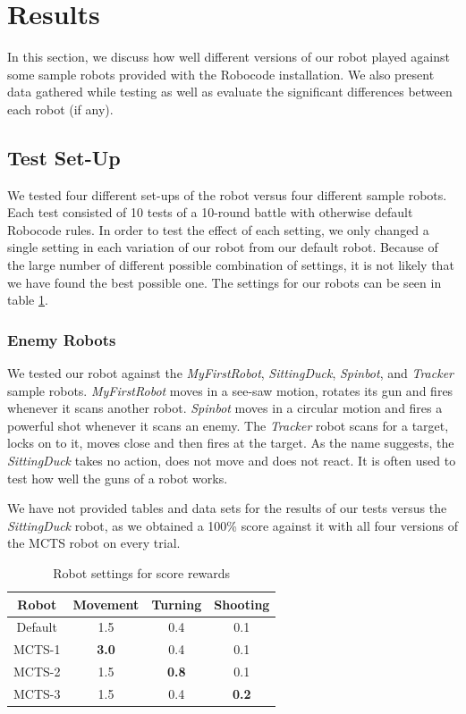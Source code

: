 \section{Results}
\label{05}
In this section, we discuss how well different versions of our robot played against some sample robots provided with the Robocode installation. We also present data gathered while testing as well as evaluate the significant differences between each robot (if any).

\subsection{Test Set-Up}
We tested four different set-ups of the robot versus four different sample robots. Each test consisted of 10 tests of a 10-round battle with otherwise default Robocode rules. In order to test the effect of each setting, we only changed a single setting in each variation of our robot from our default robot. Because of the large number of different possible combination of settings, it is not likely that we have found the best possible one. The settings for our robots can be seen in table \ref{table-robotsettings}.

\subsubsection{Enemy Robots} 
We tested our robot against the \textit{MyFirstRobot}, \textit{SittingDuck}, \textit{Spinbot}, and \textit{Tracker} sample robots. \textit{MyFirstRobot} moves in a see-saw motion, rotates its gun and fires whenever it scans another robot. \textit{Spinbot} moves in a circular motion and fires a powerful shot whenever it scans an enemy. The \textit{Tracker} robot scans for a target, locks on to it, moves close and then fires at the target. As the name suggests, the \textit{SittingDuck} takes no action, does not move and does not react. It is often used to test how well the guns of a robot works.

We have not provided tables and data sets for the results of our tests versus the \textit{SittingDuck} robot, as we obtained a 100\% score against it with all four versions of the MCTS robot on every trial. 

\begin{table}
\begin{center}
\renewcommand{\arraystretch}{1}
\caption{Robot settings for score rewards}
\label{table-robotsettings}
\begin{tabular}{|c | c | c |c |}
\hline
Robot & Movement & Turning & Shooting\\
\hline
Default & 1.5 & 0.4 & 0.1\\
\hline
MCTS-1 & \textbf{3.0} & 0.4 & 0.1\\
\hline
MCTS-2 & 1.5 & \textbf{0.8} & 0.1\\
\hline
MCTS-3 & 1.5 & 0.4 & \textbf{0.2}\\
\hline
\end{tabular}
\end{center}
\end{table}

